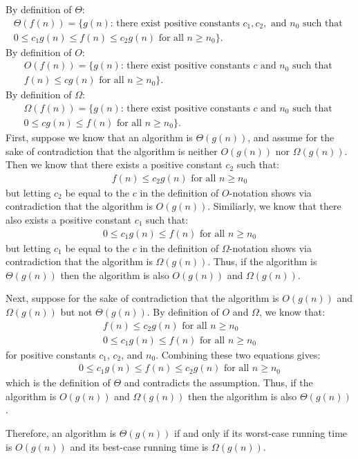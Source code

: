 By definition of $\Theta$:
\begin{eqnarray*}
	\Theta(f(n)) = \{g(n) \text{: there exist positive constants } c_1, c_2, \text{ and } n_0 \text{ such that } \\
	0 \leq c_1 g(n) \leq f(n) \leq c_2 g(n) \text{ for all } n \geq n_0\}.
\end{eqnarray*}
By definition of $O$:
\begin{eqnarray*}
	O(f(n)) = \{g(n) \text{: there exist positive constants } c \text{ and } n_0 \text{ such that } \\
	f(n) \leq c g(n) \text{ for all } n \geq n_0\}.
\end{eqnarray*}
By definition of $\Omega$:
\begin{eqnarray*}
	\Omega(f(n)) = \{g(n) \text{: there exist positive constants } c \text{ and } n_0 \text{ such that } \\
	0 \leq c g(n) \leq f(n) \text{ for all } n \geq n_0\}.
\end{eqnarray*}
First, suppose we know that an algorithm is $\Theta(g(n))$, and assume for the sake of contradiction that the algorithm is neither $O(g(n))$ nor $\Omega(g(n))$. Then we know that there exists a positive constant $c_2$ such that:
\begin{eqnarray*}
	f(n) \leq c_2 g(n) \text{ for all } n \geq n_0
\end{eqnarray*}
but letting $c_2$ be equal to the $c$ in the definition of $O$-notation shows via contradiction that the algorithm is $O(g(n))$. Similiarly, we know that there also exists a positive constant $c_1$ such that:
\begin{eqnarray*}
	0 \leq c_1 g(n) \leq f(n) \text{ for all } n \geq n_0
\end{eqnarray*}
but letting $c_1$ be equal to the $c$ in the definition of $\Omega$-notation shows via contradiction that the algorithm is $\Omega(g(n))$. Thus, if the algorithm is $\Theta(g(n))$ then the algorithm is also $O(g(n))$ and $\Omega(g(n))$.

Next, suppose for the sake of contradiction that the algorithm is $O(g(n))$ and $\Omega(g(n))$ but not $\Theta(g(n))$. By definition of $O$ and $\Omega$, we know that:
\begin{eqnarray*}
	f(n) \leq c_2 g(n) \text{ for all } n \geq n_0 \\
	0 \leq c_1 g(n) \leq f(n) \text{ for all } n \geq n_0
\end{eqnarray*}
for positive constants $c_1$, $c_2$, and $n_0$. Combining these two equations gives:
\begin{eqnarray*}
	0 \leq c_1 g(n) \leq f(n) \leq c_2 g(n) \text{ for all } n \geq n_0
\end{eqnarray*}
which is the definition of $\Theta$ and contradicts the assumption. Thus, if the algorithm is $O(g(n))$ and $\Omega(g(n))$ then the algorithm is also $\Theta(g(n))$.

Therefore, an algorithm is $\Theta(g(n))$ if and only if its worst-case running time is $O(g(n))$ and its best-case running time is $\Omega(g(n))$.
